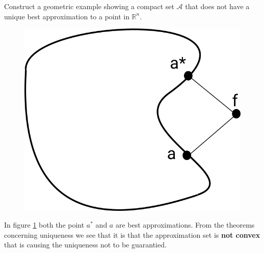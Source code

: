 
\begin{problem}
Construct a geometric example showing a compact set $\mathcal{A}$
that does not have a unique best approximation to a point in $\mathds{R}^n$.
\end{problem}
 
\begin{solution}  
\begin{figure}[!ht]
  \centering
  \includegraphics[scale = 0.2]{drawing_task_1.png}
  \label{fig:task_1}
\end{figure}
In figure \ref{fig:task_1} both the point $a^*$ and $a$ are best
approximations. From the theorems concerning uniqueness we see that
it is that the approximation set is {\bf not convex} that is causing the
uniqueness not to be guarantied.
\end{solution}

